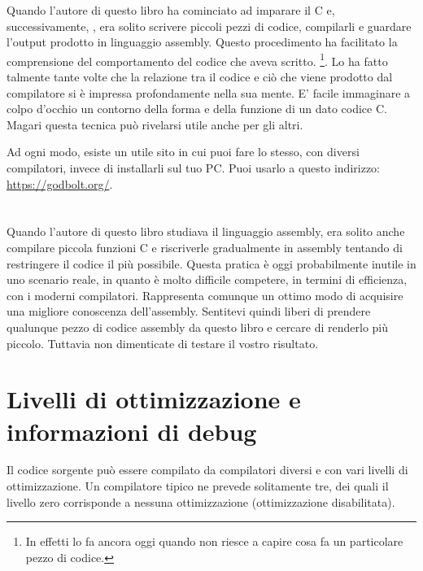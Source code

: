 
Quando l'autore di questo libro ha cominciato ad imparare il C e, successivamente, \Cpp, era solito scrivere piccoli pezzi di codice, compilarli e guardare l'output prodotto in linguaggio assembly. Questo procedimento ha facilitato la comprensione del comportamento del codice che aveva scritto.
\footnote{In effetti lo fa ancora oggi quando non riesce a capire cosa fa un particolare pezzo di codice.}.
Lo ha fatto talmente tante volte che la relazione tra il codice \CCpp e ciò che viene prodotto dal compilatore si è impressa profondamente nella sua mente. E' facile immaginare a colpo d'occhio un contorno della forma e della funzione di un dato codice C.
Magari questa tecnica può rivelarsi utile anche per gli altri.


Ad ogni modo, esiste un utile sito in cui puoi fare lo stesso, con diversi compilatori, invece di installarli sul tuo PC.
Puoi usarlo a questo indirizzo: \url{https://godbolt.org/}.

\section*{\Exercises}

Quando l'autore di questo libro studiava il linguaggio assembly, era solito anche compilare piccola funzioni C e riscriverle gradualmente in assembly tentando di restringere il codice il più possibile.
Questa pratica è oggi probabilmente inutile in uno scenario reale, in quanto è molto difficile competere, in termini di efficienza, con i moderni compilatori. Rappresenta comunque un ottimo modo di acquisire una migliore conoscenza dell'assembly.
Sentitevi quindi liberi di prendere qualunque pezzo di codice assembly da questo libro e cercare di renderlo più piccolo. Tuttavia non dimenticate di testare il vostro risultato.

\section*{Livelli di ottimizzazione e informazioni di debug}

Il codice sorgente può essere compilato da compilatori diversi e con vari livelli di ottimizzazione.
Un compilatore tipico ne prevede solitamente tre, dei quali il livello zero corrisponde a nessuna ottimizzazione (ottimizzazione disabilitata).

